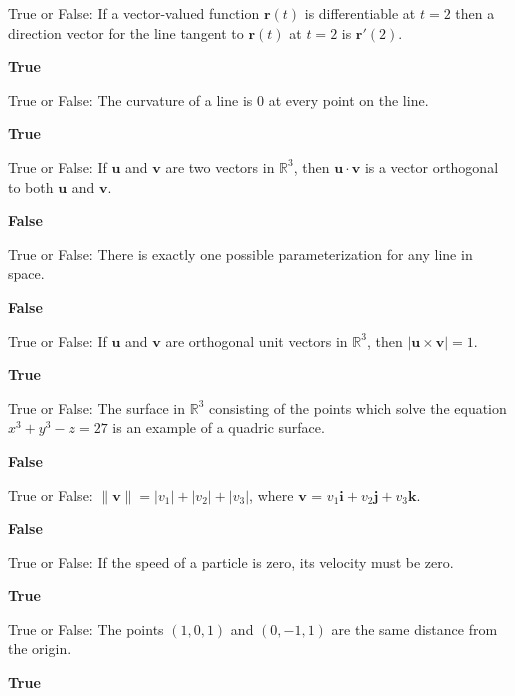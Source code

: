 \documentclass{exam}
\newcommand{\R}{\mathbb{R}}
\newcommand{\bi}{\mathbf{i}}
\newcommand{\bj}{\mathbf{j}}
\newcommand{\bk}{\mathbf{k}}
\newcommand{\br}{\mathbf{r}}
\newcommand{\bu}{\mathbf{u}}
\newcommand{\bv}{\mathbf{v}}
\begin{document}
\begin{questions}
		\question True or False: If a vector-valued function $\br(t)$ is differentiable at $t=2$ then a direction vector for the line tangent to  $\br(t)$ at $t=2$ is $\br'(2)$. 
		 \begin{solution}
		 	\textbf{True}
		 \end{solution}
		
		
		\question True or False: The curvature of a line is $0$ at every point on the line. 
		 \begin{solution}
		 	\textbf{True}
		 \end{solution}
		
		\question True or False: If $\bu$ and $\bv$ are two vectors in $\R^3$, then $\bu\cdot\bv$ is a vector orthogonal to both $\bu$ and $\bv$.
		 \begin{solution}
		 	\textbf{False}
		 \end{solution}
		
		\question True or False: There is exactly one possible parameterization for any line in space.
		 \begin{solution}
		 	\textbf{False}
		 \end{solution}
		
		\question True or False: If $\bu$ and $\bv$ are orthogonal unit vectors in $\R^3$, then $|\bu\times\bv|=1$.
		 \begin{solution}
		 	\textbf{True}
		 \end{solution}
		
		\question True or False: The surface in $\R^3$ consisting of the points which solve the equation $x^3+y^3-z=27$ is an example of a quadric surface.
		 \begin{solution}
		 	\textbf{False}
		 \end{solution}
		
		\question True or False: $\|\bv\| = |v_1| + |v_2| + |v_3|$, where $\bv$ = $v_1 \bi + v_2 \bj + v_3\bk$.
		 \begin{solution}
		 	\textbf{False}
		 \end{solution}
		
		\question True or False: If the speed of a particle is zero, its velocity must be zero. 
		 \begin{solution}
		 	\textbf{True}
		 \end{solution}
		
		\question True or False: The points $(1,0,1)$ and $(0,-1,1)$ are the same distance from the origin. 
		 \begin{solution}
		 	\textbf{True}
		 \end{solution}
		

\end{questions}
\end{document}
